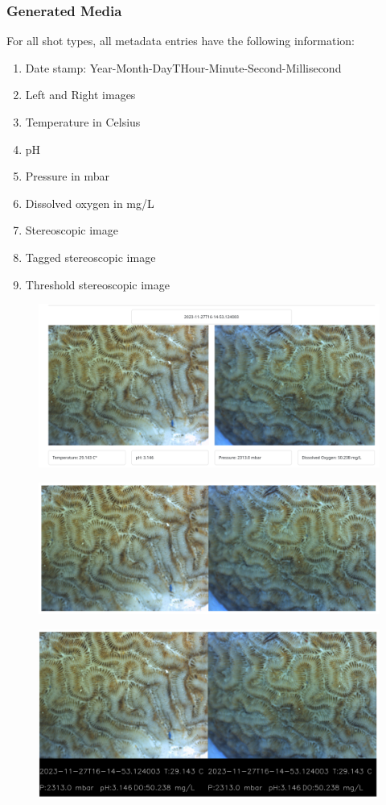 \documentclass[12pt]{article}
\begin{document}
\begin{center}
	\subsubsection{Generated Media}
	For all shot types, all metadata entries have the following information:
	\begin{enumerate}
		\item Date stamp: Year-Month-DayTHour-Minute-Second-Millisecond
		\item Left and Right images
		\item Temperature in Celsius
		\item pH
		\item Pressure in mbar
		\item Dissolved oxygen in mg/L
		\item Stereoscopic image
		\item Tagged stereoscopic image
		\item Threshold stereoscopic image
	\end{enumerate}
	\begin{figure}[H]
		\includegraphics[width=\textwidth]{Figures/L-R-Image.png}
	\end{figure}
	\begin{figure}[H]
		\includegraphics[width=\textwidth]{Figures/Stereo-Image.png}
	\end{figure}
	\begin{figure}[H]
		\includegraphics[width=\textwidth]{Figures/Tagged-Image.png}

\end{figure}
\end{center}
\end{document}
